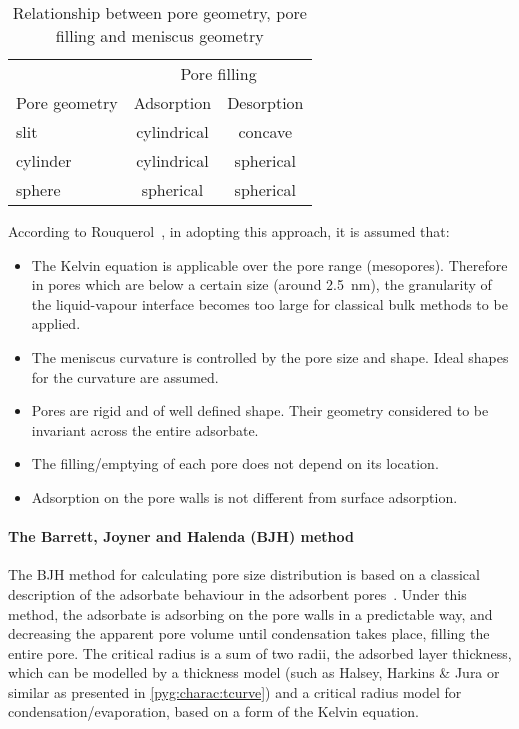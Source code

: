 \begin{table}[htb]
	\centering
	\caption{Relationship between pore geometry, pore filling and meniscus geometry}%
	\label{pyg:tab:kelvin-meniscus}
	\begin{tabular}{lcc}
		\toprule
		              & \multicolumn{2}{c}{Pore filling}              \\
		\cmidrule{2-3}
		Pore geometry & Adsorption                       & Desorption \\
		\midrule
		slit          & cylindrical                      & concave    \\
		cylinder      & cylindrical                      & spherical  \\
		sphere        & spherical                        & spherical  \\
		\bottomrule
	\end{tabular}
\end{table}

According to Rouquerol~\cite{rouquerolAdsorptionPowdersPorous2013},
in adopting this approach, it is assumed that:

\begin{itemize}

	\item The Kelvin equation is applicable over the pore
	      range (mesopores). Therefore in pores which are below a
	      certain size (around \SI{2.5}{\nano\meter}), the granularity
	      of the liquid-vapour interface becomes too large for classical
	      bulk methods to be applied.
	\item The meniscus curvature is controlled by the pore size and
	      shape. Ideal shapes for the curvature are assumed.
	\item Pores are rigid and of well defined shape. Their geometry
	      considered to be invariant across the entire adsorbate.
	\item The filling/emptying of each pore does not depend on its location.
	\item Adsorption on the pore walls is not different from
	      surface adsorption.

\end{itemize}

\paragraph{The Barrett, Joyner and Halenda (BJH) method}

The BJH method for calculating pore size distribution
is based on a classical description of the adsorbate behaviour
in the adsorbent pores~\cite{barrettDeterminationPoreVolume1951}.
Under this method, the adsorbate is adsorbing on the pore walls
in a predictable way, and decreasing the apparent pore volume until
condensation takes place, filling the entire pore. The critical radius
is a sum of two radii, the adsorbed layer thickness, which can be
modelled by a thickness model (such as Halsey, Harkins \& Jura or similar
as presented in \autoref{pyg:charac:tcurve})
and a critical radius model for condensation/evaporation,
based on a form of the Kelvin equation.

